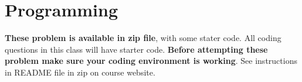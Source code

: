 \documentclass{article}
\begin{document}

\newpage
\section*{Programming}
\textbf{These problem is available in zip file}, with some stater code. All coding questions in this class will have starter code.
\textbf{Before attempting these problem make sure your coding environment is working}. See instructions in README file in zip on course website.
\end{document}
